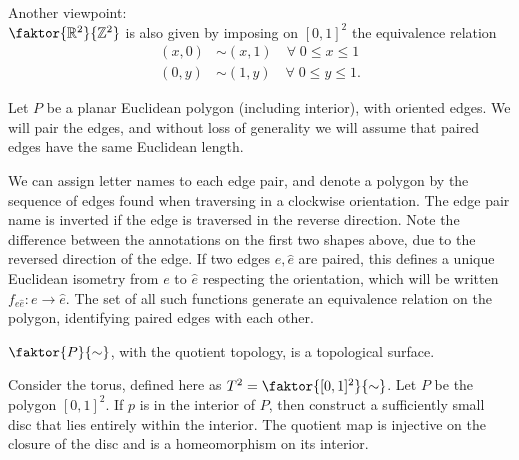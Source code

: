 \begin{example}
	Another viewpoint: \\
	$\faktor{\mathbb R^2}{\mathbb Z^2}$ is also given by imposing on $[0, 1]^2$ the equivalence  relation
	\begin{align*}
		(x, 0) &\sim (x, 1) \quad \forall \; 0 \leq x \leq 1\\
		(0, y) &\sim (1, y) \quad \forall \; 0 \leq y \leq 1.
	\end{align*} 
\end{example}

\begin{example}
	Let $P$ be a planar Euclidean polygon (including interior), with oriented edges.
	We will pair the edges, and without loss of generality we will assume that paired edges have the same Euclidean length.
	\begin{center}
		\quad
		\quad
	\end{center}
	We can assign letter names to each edge pair, and denote a polygon by the sequence of edges found when traversing in a clockwise orientation.
	The edge pair name is inverted if the edge is traversed in the reverse direction.
	Note the difference between the annotations on the first two shapes above, due to the reversed direction of the edge.
	If two edges $e, \hat e$ are paired, this defines a unique Euclidean isometry from $e$ to $\hat e$ respecting the orientation, which will be written $f_{e\hat e} : e \to \hat e$.
	The set of all such functions generate an equivalence relation on the polygon, identifying paired edges with each other.
	\begin{lemma}
		$\faktor{P}{\sim}$, with the quotient topology, is a topological surface.
	\end{lemma}
	\begin{example}
		Consider the torus, defined here as $T^2 = \faktor{[0,1]^2}{\sim}$.
		Let $P$ be the polygon $[0,1]^2$.
		If $p$ is in the interior of $P$, then construct a sufficiently small disc that lies entirely within the interior.
		The quotient map is injective on the closure of the disc and is a homeomorphism on its interior.


\end{example}
\end{example}
